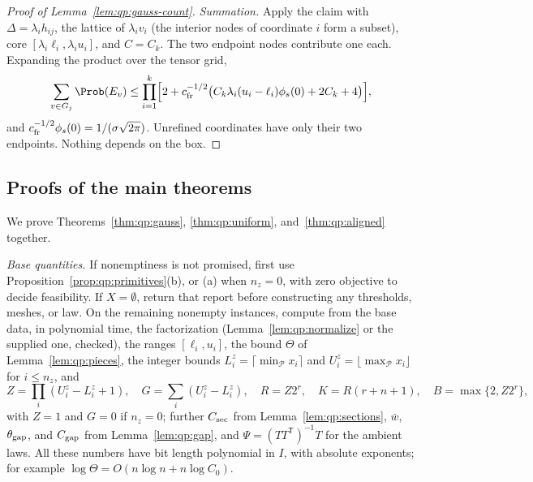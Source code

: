 \begin{proof}[Proof of Lemma~\ref{lem:qp:gauss-count}]
\emph{Summation.} Apply the claim with $\Delta=\lambda_ih_{ij}$, the lattice of
$\lambda_iv_i$ (the interior nodes of coordinate $i$ form a subset), core
$[\lambda_i\ell_i,\lambda_iu_i]$, and $C=C_k$. The two endpoint nodes
contribute one each. Expanding the product over the tensor grid,
\[
 \sum_{v\in G_j}\Prob(E_v)\le\prod_{i=1}^k\Bigl[2+c_{\rm fr}^{-1/2}\bigl(C_k\lambda_i(u_i-\ell_i)\phi_s(0)+2C_k+4\bigr)\Bigr],
\]
and $c_{\rm fr}^{-1/2}\phi_s(0)=1/(\sigma\sqrt{2\pi})$. Unrefined coordinates
have only their two endpoints. Nothing depends on the box.
\end{proof}

\subsection{Proofs of the main theorems}\label{app:qp:main}

We prove Theorems~\ref{thm:qp:gauss}, \ref{thm:qp:uniform},
and~\ref{thm:qp:aligned} together.

\emph{Base quantities.} If nonemptiness is not promised, first use
Proposition~\ref{prop:qp:primitives}(b), or (a) when $n_z=0$, with zero
objective to decide feasibility. If $X=\emptyset$, return that report
before constructing any thresholds, meshes, or law. On the remaining
nonempty instances, compute from the base data, in polynomial time, the
factorization (Lemma~\ref{lem:qp:normalize} or the supplied one, checked), the
ranges $[\ell_i,u_i]$, the bound $\Theta$ of Lemma~\ref{lem:qp:pieces}, the
integer bounds $L_i^z=\lceil\min_{\mathcal P}x_i\rceil$ and
$U_i^z=\lfloor\max_{\mathcal P}x_i\rfloor$ for $i\le n_z$, and
\[
 Z=\prod_i(U_i^z-L_i^z+1),\quad G=\sum_i(U_i^z-L_i^z),\quad R=Z2^r,\quad
 K=R(r+n+1),\quad B=\max\{2,Z2^r\},
\]
with $Z=1$ and $G=0$ if $n_z=0$; further $C_{\rm sec}$ from
Lemma~\ref{lem:qp:sections}, $\bar w$, $\theta_{\rm gap}$, and $C_{\rm gap}$ from
Lemma~\ref{lem:qp:gap}, and $\Psi=(TT^{\mathsf T})^{-1}T$ for the ambient laws.
All these numbers have bit length
polynomial in $I$, with absolute exponents; for example
$\log\Theta=O(n\log n+n\log C_0)$.

